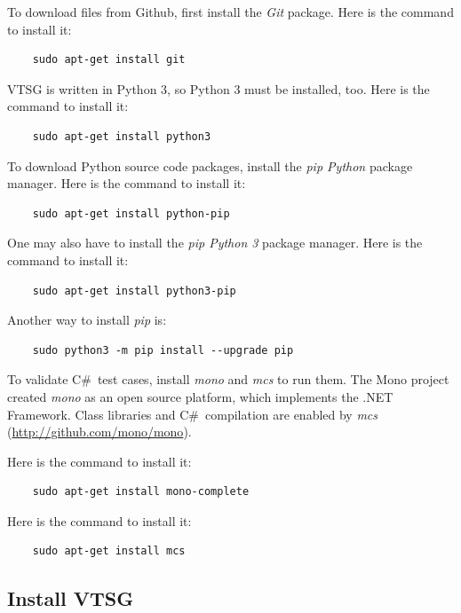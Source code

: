 \documentclass[12pt]{article}
\newcommand{\CSharp}{C{\fontseries{b}\selectfont\#}}
\begin{document}
\noindent To download files from Github, first install the \emph{Git} package.
Here is the command to install it:

\begin{verbatim}
    sudo apt-get install git    
\end{verbatim}

\noindent VTSG is written in Python 3, so Python 3 must be installed, too.
Here is the command to install it:

\begin{verbatim}
    sudo apt-get install python3
\end{verbatim}

\noindent To download Python source code packages, install the \emph{pip
Python} package manager.
Here is the command to install it:

\begin{verbatim}
    sudo apt-get install python-pip
\end{verbatim}

\noindent One may also have to install the \emph{pip Python 3} package manager.
Here is the command to install it:

\begin{verbatim}
    sudo apt-get install python3-pip
\end{verbatim}

\noindent Another way to install \emph{pip} is:

\begin{verbatim}
    sudo python3 -m pip install --upgrade pip
\end{verbatim}

\noindent To validate \CSharp\ test cases, install \emph{mono} and \emph{mcs}
to run them. The Mono project created \emph{mono} as an open source
platform, which
implements the .NET Framework. Class libraries and \CSharp\ compilation are enabled
by \emph{mcs} (\href{http://github.com/mono/mono}{http://github.com/mono/mono}).

\noindent Here is the command to install it:

\begin{verbatim}
    sudo apt-get install mono-complete
\end{verbatim}

\noindent Here is the command to install it:

\begin{verbatim}
    sudo apt-get install mcs
\end{verbatim}

\subsection{Install VTSG}
\end{document}
